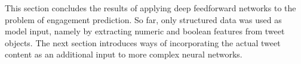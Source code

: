 This section concludes the results of applying deep feedforward networks to
the problem of engagement prediction. 
So far, only structured data was used as model input, namely by extracting
numeric and boolean features from tweet objects.
The next section introduces ways of incorporating the actual tweet content as
an additional input to more complex neural networks.

